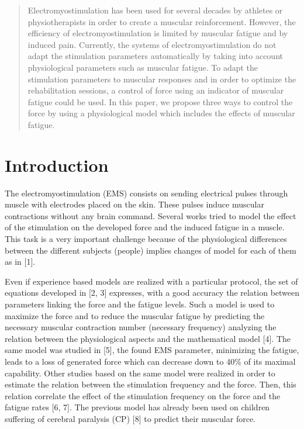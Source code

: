 \documentclass[10pt,twocolumn,letterpaper, 
]{article}
\begin{document}

\maketitle
\begin{abstract}

Electromyostimulation has been used for several decades by athletes or physiotherapists in order to create a muscular reinforcement. However, the efficiency of electromyostimulation is limited by muscular fatigue and by induced pain. Currently, the systems of electromyostimulation do not adapt the stimulation parameters automatically by taking into account physiological parameters such as muscular fatigue. To adapt the stimulation parameters to muscular responses and in order to optimize the rehabilitation sessions, a control of force using an indicator of muscular fatigue could be used. In this paper, we propose three ways to control the force by using a physiological model which includes the effects of muscular fatigue.
\end{abstract}
\section{Introduction}

The electromyostimulation (EMS) consists on sending electrical pulses through muscle with electrodes placed on the skin. These pulses induce muscular contractions without any brain command. Several works tried to model the effect of the stimulation on the developed force and the induced fatigue in a muscle. This task is a very important challenge because of the physiological differences between the different subjects (people) implies changes of model for each of them as in [1].

Even if experience based models are realized with a particular protocol, the set of equations developed in [2, 3] expresses, with a good accuracy the relation between parameters linking the force and the fatigue levels. Such a model is used to maximize the force and to reduce the muscular fatigue by predicting the necessary muscular contraction number (necessary frequency) analyzing the relation between the physiological aspects and the mathematical model [4]. The same model was studied in [5], the found EMS parameter, minimizing the fatigue, leads to a loss of generated force which can decrease down to 40\% of its maximal capability. Other studies based on the same model were realized in order to estimate the relation between the stimulation frequency and the force. Then, this relation correlate the effect of the stimulation frequency on the force and the fatigue rates [6, 7]. The previous model has already been used on children suffering of cerebral paralysis (CP) [8] to predict their muscular force. 
\end{document}
